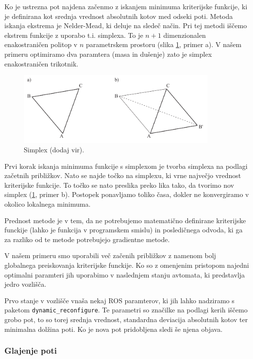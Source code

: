 \documentclass[10pt,a4paper]{article}
\begin{document}
Ko je ustrezna pot najdena začenmo z iskanjem minimuma kriterijske funkcije, ki je definirana kot srednja vrednost absolutnih kotov med odseki poti. Metoda iskanja ekstrema je Nelder-Mead, ki deluje na sledeč način. Pri tej metodi iščemo ekstrem funkcije z uporabo t.i. simplexa. To je $n+1$ dimenzionalen enakostraničen politop v $n$ parametrskem prostoru (slika \ref{fig:slika6}, primer a). V našem primeru optimiramo dva paramtera (masa in dušenje) zato je simplex enakostraničen trikotnik.

\begin{figure}[H]
	\centering
	\includegraphics[width=10cm]{pic/simplex.png}
	\caption{Simplex (dodaj vir).}
	\label{fig:slika6}
\end{figure}

Prvi korak iskanja minimuma funkcije s simplexom je tvorba simplexa na podlagi začetnih približkov. Nato se najde točko na simplexu, ki vrne največjo vrednost kriterijske funkcije. To točko se nato preslika preko lika tako, da tvorimo nov simplex (\ref{fig:slika6}, primer b). Postopek ponavljamo toliko časa, dokler ne konvergiramo v okolico lokalnega minimuma.

Prednost metode je v tem, da ne potrebujemo matematično definirane kriterijske funckije (lahko je funkcija v programskem smislu) in posledičnega odvoda, ki ga za razliko od te metode potrebujejo gradientne metode.

V našem primeru smo uporabili več začenih približkov z namenom bolj globalnega preiskovanja kriterijske funckije. Ko so z omenjenim pristopom najedni optimalni paramteri jih uporabimo v naslednjem stanju avtomata, ki predstavlja jedro vozlišča.

Prvo stanje v vozlišče vnaša nekaj ROS paramterov, ki jih lahko nadziramo s paketom \verb|dynamic_reconfigure|. Te parametri so značilke na podlagi kerih iščemo grobo pot, to so torej srednja vrednost, standardna deviacija absolutnih kotov ter minimalna dolžina poti. Ko je nova pot pridobljena sledi še njena objava.

\subsubsection{Glajenje poti}
\end{document}
